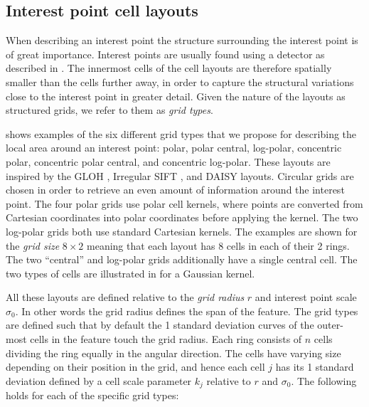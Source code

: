 \documentclass[thesis.tex]{subfiles}
\begin{document}
\subsection{Interest point cell layouts}
\label{sec:cellApertureFunctionPoint}
When describing an interest point the structure surrounding the interest point is of great importance. Interest points are usually found using a detector as described in . The innermost cells of the cell layouts are therefore spatially smaller than the cells further away, in order to capture the structural variations close to the interest point in greater detail. Given the nature of the layouts as structured grids, we refer to them as \emph{grid types}.

 shows examples of the six different grid types that we propose for describing the local area around an interest point: polar, polar central, log-polar, concentric polar, concentric polar central, and concentric log-polar. These layouts are inspired by the GLOH \cite{mikolajczyk2005performance}, Irregular SIFT \cite{cui2009scale}, and DAISY \cite{tola2008fast} layouts. Circular grids are chosen in order to retrieve an even amount of information around the interest point. The four polar grids use polar cell kernels, where points are converted from Cartesian coordinates into polar coordinates before applying the kernel. The two log-polar grids both use standard Cartesian kernels. The examples are shown for the \emph{grid size} $8 \times 2$ meaning that each layout has 8 cells in each of their 2 rings. The two ``central'' and log-polar grids additionally have a single central cell. The two types of cells are illustrated in  for a Gaussian kernel.

All these layouts are defined relative to the \emph{grid radius} $r$ and interest point scale $\sigma_0$. In other words the grid radius defines the span of the feature. The grid types are defined such that by default the 1 standard deviation curves of the outer-most cells in the feature touch the grid radius. Each ring consists of $n$ cells dividing the ring equally in the angular direction. The cells have varying size depending on their position in the grid, and hence each cell $j$ has its 1 standard deviation defined by a cell scale parameter $k_j$ relative to $r$ and $\sigma_0$. The following holds for each of the specific grid types:
\end{document}
